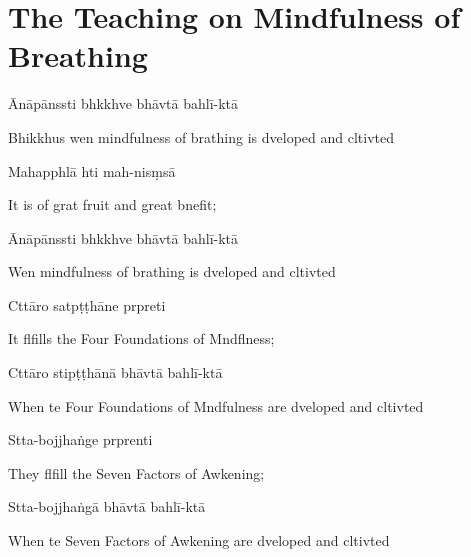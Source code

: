 \chapter{The Teaching on Mindfulness of Breathing}%

\begin{leader}
\end{leader}

Ānāpānssti bhkkhve bhāvtā bahlī-ktā

\begin{english}
  Bhikkhus wen mindfulness of brathing is dveloped and cltivted
\end{english}

Mahapphlā hti mah-nisṃsā

\begin{english}
  It is of grat fruit and great bnefit;
\end{english}

Ānāpānssti bhkkhve bhāvtā bahlī-ktā

\begin{english}
  Wen mindfulness of brathing is dveloped and cltivted
\end{english}

Cttāro satpṭṭhāne prpreti

\begin{english}
  It flfills the Four Foundations of Mndflness;
\end{english}

Cttāro stipṭṭhānā bhāvtā bahlī-ktā

\begin{english}
  When te Four Foundations of Mndfulness are dveloped and cltivted
\end{english}

Stta-bojjhaṅge prprenti

\begin{english}
  They flfill the Seven Factors of Awkening;
\end{english}

Stta-bojjhaṅgā bhāvtā bahlī-ktā

\begin{english}
  When te Seven Factors of Awkening are dveloped and cltivted
\end{english}

